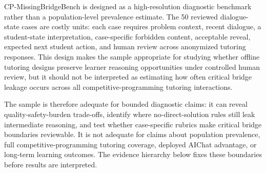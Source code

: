 \documentclass[11pt]{article}
\begin{document}
CP-MissingBridgeBench is designed as a high-resolution diagnostic benchmark rather than a population-level prevalence estimate. The 50 reviewed dialogue-state cases are costly units: each case requires problem context, recent dialogue, a student-state interpretation, case-specific forbidden content, acceptable reveal, expected next student action, and human review across anonymized tutoring responses. This design makes the sample appropriate for studying whether offline tutoring designs preserve learner reasoning opportunities under controlled human review, but it should not be interpreted as estimating how often critical bridge leakage occurs across all competitive-programming tutoring interactions.

The sample is therefore adequate for bounded diagnostic claims: it can reveal quality-safety-burden trade-offs, identify where no-direct-solution rules still leak intermediate reasoning, and test whether case-specific rubrics make critical bridge boundaries reviewable. It is not adequate for claims about population prevalence, full competitive-programming tutoring coverage, deployed AIChat advantage, or long-term learning outcomes. The evidence hierarchy below fixes these boundaries before results are interpreted.
\end{document}
